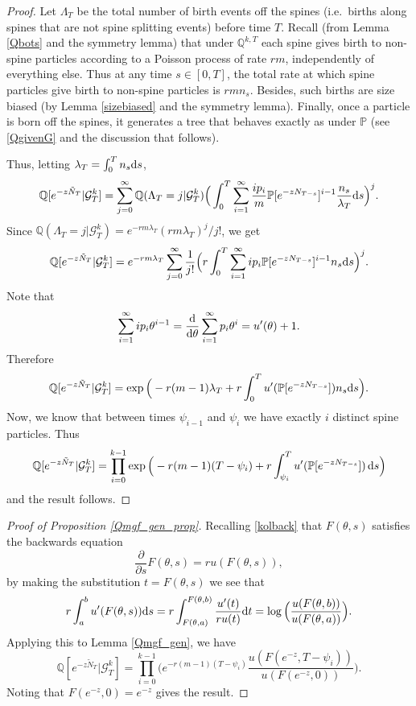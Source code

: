 \documentclass{article}
\theoremstyle{plain}
\theoremstyle{definition}
\newcommand{\Q}{\mathbb{Q}}
\renewcommand{\P}{\mathbb{P}}
\newcommand{\G}{\mathcal{G}}
\renewcommand{\d}{{\rm{d}}}
\begin{document}
\begin{proof}
Let $\Lambda_T$ be the total number of birth events off the spines (i.e.~births along spines that are not spine splitting events) before time $T$. Recall (from Lemma \ref{Qbots} and the symmetry lemma) that under $\Q^{k,T}$ each spine gives birth to non-spine particles according to a Poisson process of rate $rm$, independently of everything else. Thus at any time $s\in[0,T]$, the total rate at which spine particles give birth to non-spine particles is $r m n_s$. Besides, such births are size biased (by Lemma \ref{sizebiased} and the symmetry lemma). Finally, once a particle is born off the spines, it generates a tree that behaves exactly as under $\P$ (see \eqref{QgivenG} and the discussion that follows).

Thus, letting $\lambda_T = \int_0^T n_s \d s$,
\[\Q[e^{-z\tilde N_T}|\G^k_T] = \sum_{j=0}^\infty \Q(\Lambda_T=j|\G^k_T)\Big(\int_0^T \sum_{i=1}^{\infty} \frac{i p_i}{m}\P[e^{-zN_{T-s}}]^{i-1} \frac{n_s}{\lambda_T} \d s\Big)^j.\]
Since $\Q(\Lambda_T=j|\G^k_T) = e^{-r m\lambda_T} (rm\lambda_T)^j/j!$, we get
\[\Q[e^{-z\tilde N_T}|\G^k_T] = e^{- r m\lambda_T} \sum_{j=0}^\infty \frac{1}{j!}\Big(r \int_0^T \sum_{i=1}^\infty i p_i\P[e^{-zN_{T-s}}]^{i-1} n_s \d s\Big)^j.\]
Note that
\[\sum_{i=1}^\infty i p_i \theta^{i-1} = \frac{\d}{\d\theta} \sum_{i=1}^\infty p_i\theta^i = u'(\theta)+1.\]
Therefore
\[\Q[e^{-z\tilde N_T}|\G^k_T] = \exp\Big(-r (m-1) \lambda_T + r\int_0^T u'(\P[e^{-zN_{T-s}}]) n_s \d s\Big).\]
Now, we know that between times $\psi_{i-1}$ and $\psi_i$ we have exactly $i$ distinct spine particles. Thus
\[\Q[e^{-z\tilde N_T}|\G^k_T] = \prod_{i=0}^{k-1} \exp\Big( -r(m-1)(T-\psi_i) + r \int_{\psi_i}^T u'(\P[e^{-zN_{T-s}}])\, \d s\Big)\]
and the result follows.
\end{proof}






\begin{proof}[Proof of Proposition \ref{Qmgf_gen_prop}]
Recalling \eqref{kolback} that $F(\theta,s)$ satisfies the backwards equation
\[\frac{\partial}{\partial s} F(\theta,s) = r u(F(\theta,s)),\]
by making the substitution $t=F(\theta,s)$ we see that
\[r\int_a^b u'(F(\theta,s))\d s = r\int_{F(\theta,a)}^{F(\theta,b)} \frac{u'(t)}{ru(t)} \d t = \log\Big(\frac{u(F(\theta,b))}{u(F(\theta,a))}\Big).\]
Applying this to Lemma \ref{Qmgf_gen}, we have
\[\Q[e^{-z\tilde N_T}|\G^k_T] = \prod_{i=0}^{k-1}\Big(e^{-r(m-1)(T-\psi_i)}\frac{u(F(e^{-z},T-\psi_i))}{u(F(e^{-z},0))}\Big).\]
Noting that $F(e^{-z},0) = e^{-z}$ gives the result.
\end{proof}
\end{document}
